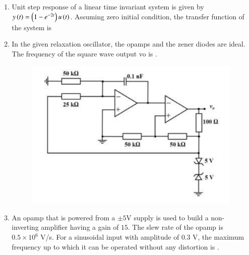 \documentclass[journal,12pt,onecolumn]{IEEEtran}
\theoremstyle{remark}
\begin{document}
\begin{enumerate}
    \hfill{}

    \item Unit step response of a linear time invariant  system is given by $y\left(t\right) = \left(1 - e^{-2t}\right)u\left(t\right)$. Assuming zero initial condition, the transfer function of the system is
    
    \hfill{}
    \begin{enumerate}
    \end{enumerate}

    \item In the given relaxation oscillator, the opamps and the zener diodes are ideal. The frequency  of the square wave output vo is \underline{\hspace{2cm}}.
    \begin{figure}[H]
        \centering
        \includegraphics[width=0.7\columnwidth]{q40.png}
        \caption*{}
        \label{fig:q40}
    \end{figure}
    
    \hfill{}

    \item An opamp that is powered from a $\pm 5$V supply is used to build a non-inverting amplifier having a gain of $15$. The slew rate of the opamp is $0.5\times10^6$ V/s. For a sinusoidal input with amplitude of $0.3$ V, the maximum frequency  up to which it can be operated without any distortion is  \underline{\hspace{2cm}}.
    

\end{enumerate}
\end{document}
